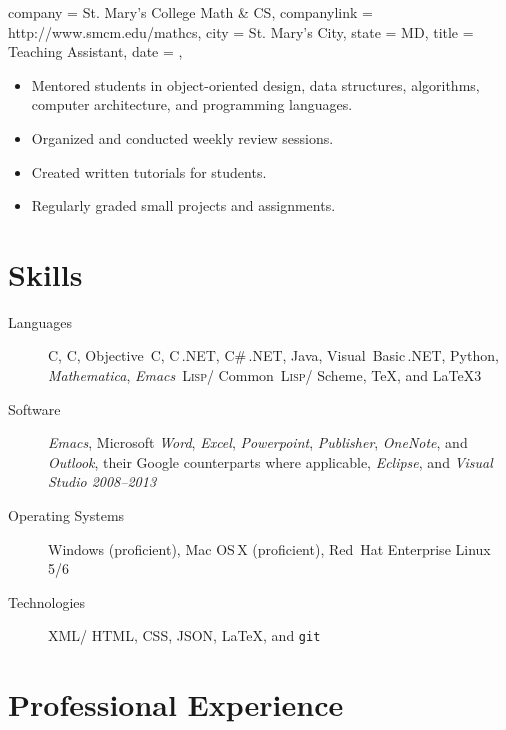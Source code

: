 \documentclass[
textout=\jobname.cv.txt,
textout preamble = preamble.txt,
]{bettercv}
\newcommand \software[1] {\textsl{#1}}
\newcommand \CPP        {{C\nolinebreak[4]\hspace{-.05em}\raisebox{.4ex}{\tiny\bf ++}}}
\newcommand \CSharp     {{C\#}}
\newcommand \Lisp       {{\textsc{Lisp}}}
\begin{document}
\begin{position}
  {
    company = St. Mary's College \Dash Math \& CS,
    companylink = http://www.smcm.edu/mathcs,
    city    = St. Mary's City,
    state   = MD,
    title   = Teaching Assistant,
    date    = ,
  }

\begin{itemize}
\item Mentored students in object-oriented design, data structures, algorithms, computer architecture, and programming languages.
\item Organized and conducted weekly review sessions.
\item Created written tutorials for students.
\item Regularly graded small projects and assignments.
\end{itemize}
\end{position}

\section{Skills}

\begin{description}
\item[Languages]
  C,
  \CPP,
  Objective~C,
  \CPP\,.NET,
  \CSharp\,.NET,
  Java,
  Visual~Basic\,.NET,
  Python,
  \software{Mathematica},
  \software{Emacs}~\Lisp\slash
            Common~\Lisp\slash
            Scheme,
  \TeX,
  and \LaTeX3

\item[Software]
  \software{Emacs},
  Microsoft \software{Word},
            \software{Excel},
            \software{Powerpoint},
            \software{Publisher},
            \software{OneNote},
            and \software{Outlook},
  their Google counterparts where applicable,
  \software{Eclipse},
  and \software{Visual Studio 2008--2013}

\item[Operating Systems]
  Windows (proficient),
  Mac OS\,X (proficient),
  Red~Hat Enterprise Linux 5\slash 6

\item[Technologies]
  XML\slash
  HTML,
  CSS,
  JSON,
  \LaTeX,
  and \texttt{git}
\end{description}

\section{Professional Experience}
\end{document}
